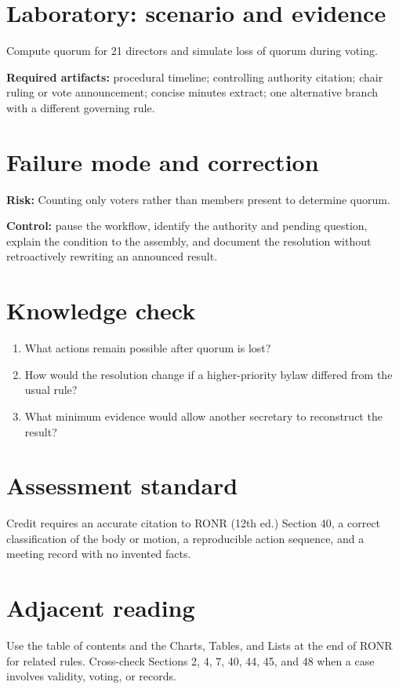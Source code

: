 \documentclass[11pt]{article}
\begin{document}
\section{Laboratory: scenario and evidence}
Compute quorum for 21 directors and simulate loss of quorum during voting.

\textbf{Required artifacts:} procedural timeline; controlling authority citation; chair ruling or vote announcement; concise minutes extract; one alternative branch with a different governing rule.

\section{Failure mode and correction}
\textbf{Risk:} Counting only voters rather than members present to determine quorum.

\textbf{Control:} pause the workflow, identify the authority and pending question, explain the condition to the assembly, and document the resolution without retroactively rewriting an announced result.

\section{Knowledge check}
\begin{enumerate}[leftmargin=*,itemsep=4pt]
\item What actions remain possible after quorum is lost?
\item How would the resolution change if a higher-priority bylaw differed from the usual rule?
\item What minimum evidence would allow another secretary to reconstruct the result?
\end{enumerate}

\section{Assessment standard}
Credit requires an accurate citation to RONR (12th ed.) Section 40, a correct classification of the body or motion, a reproducible action sequence, and a meeting record with no invented facts.

\section{Adjacent reading}
Use the table of contents and the Charts, Tables, and Lists at the end of RONR for related rules. Cross-check Sections 2, 4, 7, 40, 44, 45, and 48 when a case involves validity, voting, or records.
\end{document}
